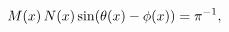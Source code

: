 \[\mathop{M\/}\nolimits\!\left(x\right)\mathop{N\/}\nolimits\!\left(x\right)%
\mathop{\sin\/}\nolimits\!\left(\mathop{\theta\/}\nolimits\!\left(x\right)-%
\mathop{\phi\/}\nolimits\!\left(x\right)\right)=\pi^{-1},\]